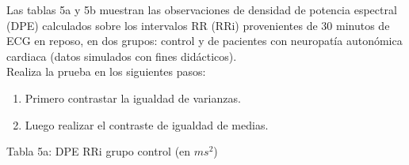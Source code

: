 \documentclass[12pt,letterpaper]{article}\usepackage[]{graphicx}\usepackage[]{color}
\begin{document}
Las tablas 5a y 5b muestran las observaciones de densidad de potencia espectral (DPE) calculados sobre los intervalos RR (RRi) provenientes de 30 minutos de ECG en reposo, en dos grupos: control y de pacientes con neuropat\'ia auton\'omica cardiaca (datos simulados con fines did\'acticos).\\ 

Realiza la prueba en los siguientes pasos:
\begin{enumerate}
  \item Primero contrastar la igualdad de varianzas. 
  \item Luego realizar el contraste de igualdad de medias. 
\end{enumerate}

\begin{center}
Tabla 5a: DPE RRi grupo control (en $ms^2$)
\end{center}
\end{document}
